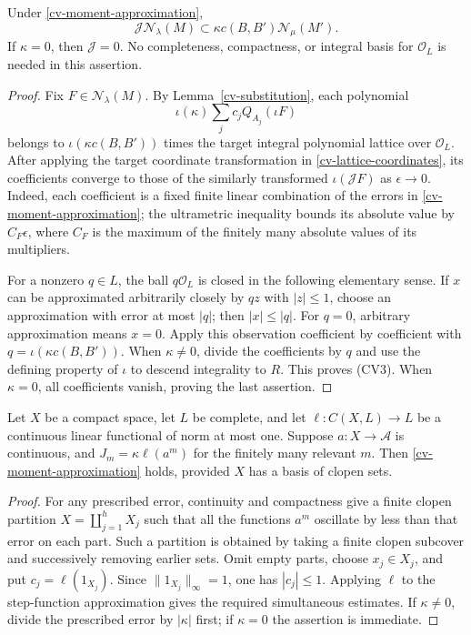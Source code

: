 \begin{theorem}\label{cv-moment-integrality}
Under \eqref{cv-moment-approximation},
\[
 \mathcal J\mathcal N_\lambda(M)
       \subset \kappa c(B,B')\mathcal N_\mu(M').
 \tag{CV3}
\]
If $\kappa=0$, then $\mathcal J=0$.
No completeness, compactness, or integral basis for $\mathcal O_L$
is needed in this assertion.
\end{theorem}
\begin{proof}
Fix $F\in\mathcal N_\lambda(M)$.  By
Lemma~\ref{cv-substitution}, each polynomial
\[
 \iota(\kappa)\sum_jc_jQ_{A_j}(\iota F)
\]
belongs to $\iota(\kappa c(B,B'))$ times the target integral
polynomial lattice over $\mathcal O_L$.
After applying the target coordinate transformation in
\eqref{cv-lattice-coordinates}, its coefficients converge to those
of the similarly transformed $\iota(\mathcal JF)$ as
$\epsilon\to0$.  Indeed, each coefficient is a fixed finite linear
combination of the errors in
\eqref{cv-moment-approximation}; the ultrametric inequality bounds
its absolute value by $C_F\epsilon$, where $C_F$ is the maximum of
the finitely many absolute values of its multipliers.

For a nonzero $q\in L$, the ball $q\mathcal O_L$ is closed in the
following elementary sense.  If $x$ can be approximated arbitrarily
closely by $qz$ with $|z|\le1$, choose an approximation with error at
most $|q|$; then $|x|\le|q|$.  For $q=0$, arbitrary approximation
means $x=0$.  Apply this observation coefficient by coefficient with
$q=\iota(\kappa c(B,B'))$.  When $\kappa\ne0$, divide the
coefficients by $q$ and use the defining property of $\iota$ to
descend integrality to $R$.  This proves (CV3).  When $\kappa=0$,
all coefficients vanish, proving the last assertion.
\end{proof}

\begin{lemma}
\label{cv-measure-approximation}
Let $X$ be a compact space, let $L$ be complete, and let
$\ell:C(X,L)\to L$ be a continuous linear functional of norm at
most one.  Suppose $a:X\to\mathscr A$ is continuous, and
$J_m=\kappa\ell(a^m)$ for the finitely many relevant $m$.
Then \eqref{cv-moment-approximation} holds, provided $X$ has a
basis of clopen sets.
\end{lemma}
\begin{proof}
For any prescribed error, continuity and compactness give a finite clopen
partition $X=\coprod_{j=1}^h X_j$ such that all the functions $a^m$
oscillate by less than that error on each part.  Such a partition is
obtained by taking a finite clopen subcover and successively removing
earlier sets.  Omit empty parts, choose $x_j\in X_j$, and put
$c_j=\ell(1_{X_j})$.  Since $\|1_{X_j}\|_\infty=1$, one has
$|c_j|\le1$.  Applying $\ell$ to the step-function approximation
gives the required simultaneous estimates.  If $\kappa\ne0$,
divide the prescribed error by $|\kappa|$ first; if $\kappa=0$
the assertion is immediate.
\end{proof}

